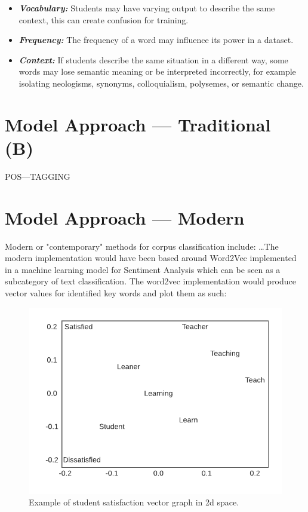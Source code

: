 \begin{itemize}
    \item \textbf{\textit{Vocabulary:}} Students may have varying output to describe the same context, this can create confusion for training.
    \item \textbf{\textit{Frequency:}} The frequency of a word may influence its power in a dataset.
    \item \textbf{\textit{Context:}} If students describe the same situation in a different way, some words may lose semantic meaning or be interpreted incorrectly, for example isolating neologisms, synonyms, colloquialism, polysemes, or semantic change.
\end{itemize}

\section{Model Approach --- Traditional (B)} \label{sub:C5ModelATraditionalB}

POS---TAGGING

\section{Model Approach --- Modern}

Modern or "contemporary" methods for corpus classification include: \ldots The modern implementation would have been based around Word2Vec implemented in a machine learning model for Sentiment Analysis which can be seen as a subcategory of text classification. The word2vec implementation would produce vector values for identified key words and plot them as such:

\begin{figure}[H]
    \centering
    \includegraphics[width=\textwidth]{figures/chapter-5/Example-Word-Vector.pdf}
    \caption[ExampleWordVector]{Example of student satisfaction vector graph in 2d space.
    \label{fig:Example-Word-Vector}}
\end{figure}

